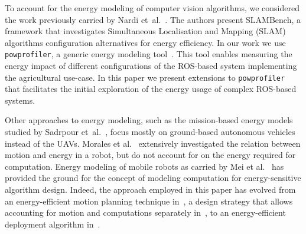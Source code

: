 \documentclass[conference, onecolumn, draftclsnofoot]{IEEEtran}
\newcommand{\stt}[1]{{\small\tt #1}} %
\newcommand{\powprof}{\stt{powprofiler}}
\begin{document}



%
To account for the energy modeling of computer vision algorithms, we
considered the work previously carried by Nardi
et~al.~\cite{nardi2015introducing}. The authors present SLAMBench, a
framework that investigates Simultaneous Localisation and Mapping (SLAM) algorithms configuration alternatives
for energy efficiency. In our work we use \powprof{}, a generic energy
modeling tool~\cite{seewald2019coarse}. This tool enables measuring
the energy impact of different configurations of the ROS-based system
implementing the agricultural use-case. In this paper we present
extensions to \powprof{} that facilitates the initial exploration of
the energy usage of complex ROS-based systems.


Other approaches to energy modeling, such as the mission-based energy
models studied by Sadrpour et~al.~\cite{sadrpour2013experimental,
  sadrpour2013mission}, focus mostly on ground-based autonomous
vehicles instead of the UAVs. Morales et al.~\cite{morales2009power}
extensively investigated the relation between motion and energy in a
robot, but do not account for on the energy required for computation.
%
Energy modeling of mobile robots as carried by Mei et
al.~\cite{mei2006deployment, mei2005case, mei2004energy} has provided
the ground for the concept of modeling computation for
energy-sensitive algorithm design. Indeed, the approach employed in this paper has evolved
from an energy-efficient motion planning technique
in~\cite{mei2004energy}, a design strategy that allows accounting for
motion and computations separately in~\cite{mei2005case}, to an
energy-efficient deployment algorithm in~\cite{mei2006deployment}.

\end{document}
